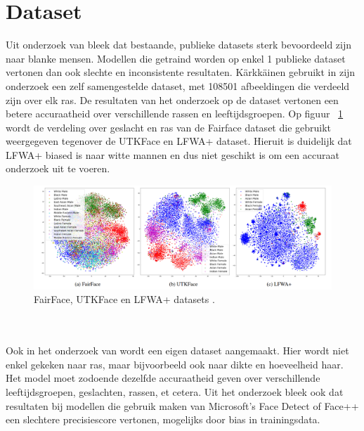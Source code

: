 \section{Dataset} \label{sec:dataset}
Uit onderzoek van \textcite{Karkkainen2021} bleek dat bestaande, publieke datasets sterk bevoordeeld zijn naar blanke mensen. Modellen die getraind worden op enkel 1 publieke dataset vertonen dan ook slechte en inconsistente resultaten. Kärkkäinen gebruikt in zijn onderzoek een zelf samengestelde dataset, met 108501 afbeeldingen die verdeeld zijn over elk ras. De resultaten van het onderzoek op de dataset vertonen een betere accuraatheid over verschillende rassen en leeftijdsgroepen. Op figuur {~\ref{fig:datasets}} wordt de verdeling over geslacht en ras van de Fairface dataset die \textcite{Karkkainen2021} gebruikt weergegeven tegenover de UTKFace en LFWA+ dataset. Hieruit is duidelijk dat LFWA+ biased is naar witte mannen en dus niet geschikt is om een accuraat onderzoek uit te voeren. \begin{figure}
    \centering
    \includegraphics[width=\columnwidth]{graphics/datasets.png}
    \caption[FairFace, UTKFace en LFWA+ datasets]{ FairFace, UTKFace en LFWA+ datasets \autocite{Karkkainen2021}.
        \label{fig:datasets}}
\end{figure}\\
\\
Ook in het onderzoek van \textcite{Buolamwini2018} wordt een eigen dataset aangemaakt. Hier wordt niet enkel gekeken naar ras, maar bijvoorbeeld ook naar dikte en hoeveelheid haar. Het model moet zodoende dezelfde accuraatheid geven over verschillende leeftijdsgroepen, geslachten, rassen, et cetera. Uit het onderzoek bleek ook dat resultaten bij modellen die gebruik maken van Microsoft's Face Detect of Face++ een slechtere precisiescore vertonen, mogelijks door bias in trainingsdata. 
 


